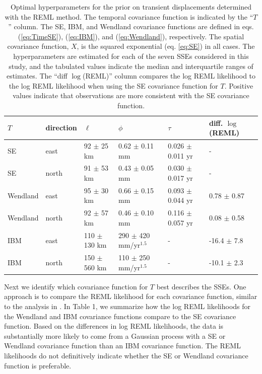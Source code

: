\documentclass[extra,mreferee]{gji}
\begin{document}
\begin{table}\label{tab:Parameters}
\caption{Optimal hyperparameters for the prior on transient displacements determined with the REML method. The temporal covariance function is indicated by the ``$T$'' column. The SE, IBM, and Wendland covariance functions are defined in eqs. (\ref{eq:TimeSE}), (\ref{eq:IBM}), and (\ref{eq:Wendland}), respectively. The spatial covariance function, $X$, is the squared exponential (eq. \ref{eq:SE}) in all cases. The hyperparameters are estimated for each of the seven SSEs considered in this study, and the tabulated values indicate the median and interquartile ranges of estimates. The ``diff $\log$(REML)'' column compares the log REML likelihood to the log REML likelihood when using the SE covariance function for $T$. Positive values indicate that observations are more consistent with the SE covariance function.} 
\begin{tabular} {l l l l l l}
$T$ & direction & $\ell$  & $\phi$   & $\tau$  & diff. $\log$(REML) \\ \hline
SE & east   & 92 $\pm$ 25 km  & 0.62 $\pm$ 0.11 mm  & 0.026 $\pm$ 0.011 yr  &  - \\
SE & north  & 91 $\pm$ 53 km  & 0.43 $\pm$ 0.05 mm  & 0.030 $\pm$ 0.017 yr  &  - \\
Wendland & east   & 95 $\pm$ 30 km  & 0.66 $\pm$ 0.15 mm  & 0.093 $\pm$ 0.044 yr &  0.78 $\pm$ 0.87 \\
Wendland & north  & 92 $\pm$ 57 km  & 0.46 $\pm$ 0.10 mm  & 0.116 $\pm$ 0.057 yr &  0.08 $\pm$ 0.58 \\
IBM & east   & 110 $\pm$ 130 km & 290 $\pm$ 420 mm/yr$^{1.5}$  & -          & -16.4 $\pm$ 7.8 \\
IBM & north  & 150 $\pm$ 560 km & 110 $\pm$ 250 mm/yr$^{1.5}$ & -           & -10.1 $\pm$ 2.3 \\
\end{tabular}
\end{table}

Next we identify which covariance function for $T$ best describes the SSEs. One approach is to compare the REML likelihood for each covariance function, similar to the analysis in \citet{Langbein2004}. In Table 1, we summarize how the log REML likelihoods for the Wendland and IBM covariance functions compare to the SE covariance function.  Based on the differences in log REML likelihoods, the data is substantially more likely to come from a Gaussian process with a SE or Wendland covariance function than an IBM covariance function. The REML likelihoods do not definitively indicate whether the SE or Wendland covariance function is preferable. 
\end{document}
